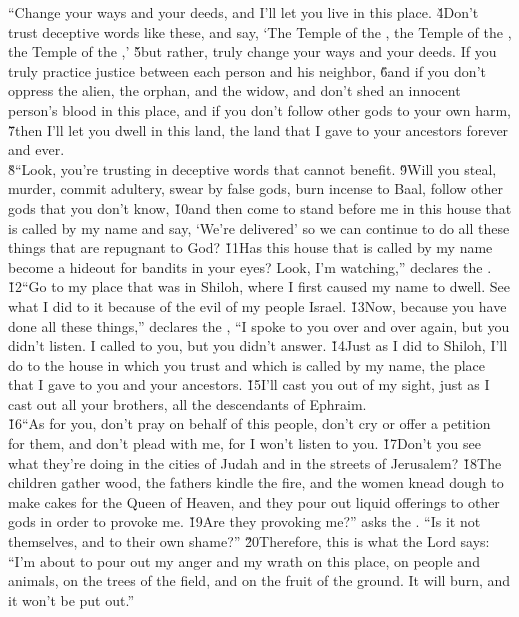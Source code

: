 \begin{poetry}
\poeml ``Change your ways and your deeds, and I'll let you live in this place. \v{4}Don't trust deceptive words like these, and say, `The Temple of the , the Temple of the , the Temple of the ,' \v{5}but rather, truly change your ways and your deeds. If you truly practice justice between each person and his neighbor, \v{6}and if you don't oppress the alien, the orphan, and the widow, and don't shed an innocent person's blood in this place, and if you don't follow other gods to your own harm, \v{7}then I'll let you dwell in this land, the land that I gave to your ancestors forever and ever. \\
\poeml \v{8}``Look, you're trusting in deceptive words that cannot benefit. \v{9}Will you steal, murder, commit adultery, swear by false gods, burn incense to Baal, follow other gods that you don't know, \v{10}and then come to stand before me in this house that is called by my name and say, `We're delivered' so we can continue to do all these things that are repugnant to God? \v{11}Has this house that is called by my name become a hideout for bandits in your eyes? Look, I'm watching,'' declares the . \\
\poeml \v{12}``Go to my place that was in Shiloh, where I first caused my name to dwell. See what I did to it because of the evil of my people Israel. \v{13}Now, because you have done all these things,'' declares the , ``I spoke to you over and over again, but you didn't listen. I called to you, but you didn't answer. \v{14}Just as I did to Shiloh, I'll do to the house in which you trust and which is called by my name, the place that I gave to you and your ancestors. \v{15}I'll cast you out of my sight, just as I cast out all your brothers, all the descendants of Ephraim. \\
\poeml \v{16}``As for you, don't pray on behalf of this people, don't cry or offer a petition for them, and don't plead with me, for I won't listen to you. \v{17}Don't you see what they're doing in the cities of Judah and in the streets of Jerusalem? \v{18}The children gather wood, the fathers kindle the fire, and the women knead dough to make cakes for the Queen of Heaven, and they pour out liquid offerings to other gods in order to provoke me. \v{19}Are they provoking me?'' asks the . ``Is it not themselves, and to their own shame?'' \v{20}Therefore, this is what the Lord  says: ``I'm about to pour out my anger and my wrath on this place, on people and animals, on the trees of the field, and on the fruit of the ground. It will burn, and it won't be put out.''
\end{poetry}

